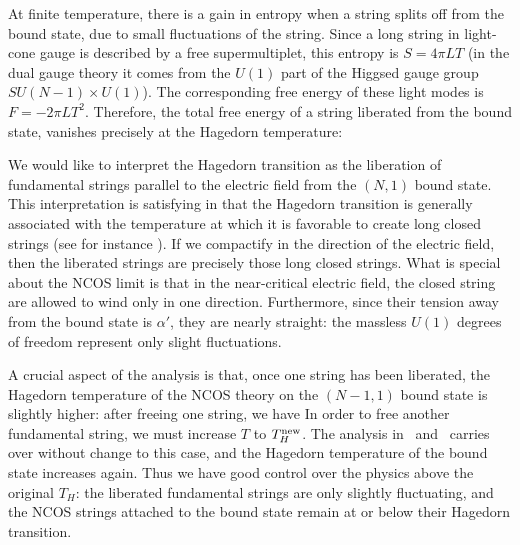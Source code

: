 At finite temperature, there is a gain in entropy when a string splits
off from the bound state, due to small fluctuations of the string.
Since a long string in light-cone gauge is described by a free
supermultiplet, this entropy is $S = 4\pi L T$ (in the dual gauge theory
it comes from the $U(1)$ part of the Higgsed gauge group 
$SU(N-1) \times U(1)$).
The corresponding free energy of these light modes is $F=-2\pi L T^2$.
Therefore, the total free energy of a string liberated from the bound state,
 vanishes precisely at the Hagedorn temperature:

We would like to interpret the Hagedorn transition as the liberation
of fundamental strings parallel to the electric field from the $(N,1)$ bound state.
This interpretation is satisfying in that the Hagedorn transition is
generally associated with the temperature at which it is favorable to
create long closed strings (see for instance \cite{Bowick,Tan}).  If we
compactify in the direction of the electric field, then the liberated
strings are precisely those long closed strings.  What is special
about the NCOS limit is that in the near-critical electric field, the
closed string are allowed to wind only in one direction.  Furthermore,
since their tension away from the bound state is $\alpha'$, they are
nearly straight: the massless $U(1)$ degrees of freedom represent only
slight fluctuations.

A crucial aspect of the analysis is that, once one string has been
liberated, the Hagedorn temperature of the NCOS theory on the
$(N-1,1)$ bound state is slightly higher: after freeing one string, we
have
 In order to free another fundamental string, we must increase $T$ to
$T_H^{\rm new}$.  The analysis in \tens\ and \FreeF\ carries over
without change to this case, and the Hagedorn temperature of the bound
state increases again.  Thus we have good control over the physics
above the original $T_H$: the liberated fundamental strings are only
slightly fluctuating, and the NCOS strings attached to the bound state
remain at or below their Hagedorn transition.


